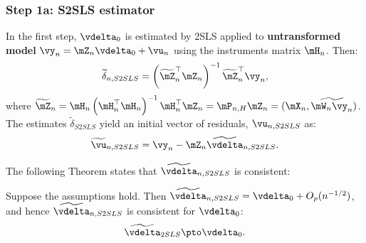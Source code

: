 \documentclass[english,12pt]{book}\usepackage[]{graphicx}\usepackage[]{xcolor}
\begin{document}
\subsubsection{Step 1a: S2SLS estimator}\label{sec:step-s2slsestimator}

In the first step, $\vdelta_0$ is estimated by 2SLS applied to \textbf{untransformed model}  $\vy_n = \mZ_n\vdelta_0 + \vu_n$ using the instruments matrix $\mH_n$. Then:
\begin{equation*}
\widetilde{\delta}_{n, S2SLS} = \left(\widetilde{\mZ}^\top_n\mZ_n\right)^{-1}\widetilde{\mZ}^\top_n\vy_n, 
\end{equation*}
%
where $\widetilde{\mZ}_n = \mH_n\left(\mH^\top_n\mH_n\right)^{-1}\mH^\top_n\mZ_n = \mP_{n,H}\mZ_n= (\mX_n, \widetilde{\mW_n\vy_n})$. The estimates $\widetilde{\delta}_{S2SLS}$ yield an initial vector of residuals, $\vu_{n, S2SLS}$ as:
\begin{equation*}
\widetilde{\vu}_{n, S2SLS} = \vy_n - \mZ_n\widetilde{\vdelta}_{n, S2SLS}.
\end{equation*}

The following Theorem states that $\widetilde{\vdelta}_{n, S2SLS}$ is consistent:

\begin{theorem}\label{teo:Consistency-2sls}
Suppose the assumptions hold. Then $\widetilde{\vdelta}_{n, S2SLS} = \vdelta_0 + O_p(n^{-1/2})$, and hence $\widetilde{\vdelta}_{n, S2SLS}$ is consistent for $\vdelta_0$:
\begin{equation*}
\widetilde{\vdelta}_{2SLS}\pto \vdelta_0.
\end{equation*}
\end{theorem}
\end{document}
